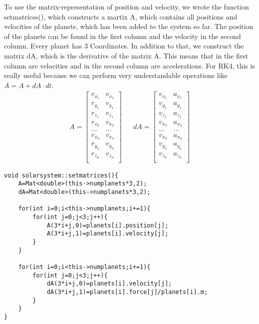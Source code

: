 \documentclass[10pt,a4paper]{article}
\begin{document}
To use the matrix-representation of position and velocity, we wrote the function setmatrices(), which constructs a martix A, which contains all positions and velocities of the planets, which has been added to the system so far. The position of the planets can be found in the first column and the velocity in the second column. Every planet has 3 Coordinates. In addition to that, we construct the matrix dA, which is the derivative of the matrix A. This means that in the first column are velocities and in the second column are accelerations. For RK4, this is really useful because we can perform very understandable operations like $A=A+dA \cdot dt $.
\begin{align}
A=
\begin{bmatrix}
r_{x_1} & v_{x_1}\\
r_{y_1} & v_{y_1} \\
r_{z_1} & v_{z_1} \\
r_{x_2} & v_{x_2} \\
... & ... \\
r_{x_n} & v_{x_n}\\
r_{y_n} & v_{y_n} \\
r_{z_n} & v_{z_n} \\
\end{bmatrix}
& &
dA=
\begin{bmatrix}
v_{x_1} & a_{x_1}\\
v_{y_1} & a_{y_1} \\
v_{z_1} & a_{z_1} \\
v_{x_2} & a_{x_2} \\
... & ... \\
v_{x_n} & a_{x_n}\\
v_{y_n} & a_{y_n} \\
v_{z_n} & a_{z_n} \\
\end{bmatrix}
\end{align}
\begin{lstlisting}
void solarsystem::setmatrices(){
    A=Mat<double>(this->numplanets*3,2);
    dA=Mat<double>(this->numplanets*3,2);
    
    for(int i=0;i<this->numplanets;i+=1){
        for(int j=0;j<3;j++){
            A(3*i+j,0)=planets[i].position[j];
            A(3*i+j,1)=planets[i].velocity[j];
        }
    }
    
    for(int i=0;i<this->numplanets;i+=1){
        for(int j=0;j<3;j++){
            dA(3*i+j,0)=planets[i].velocity[j];
            dA(3*i+j,1)=planets[i].force[j]/planets[i].m;
        }
    }
}
\end{lstlisting}
\end{document}
